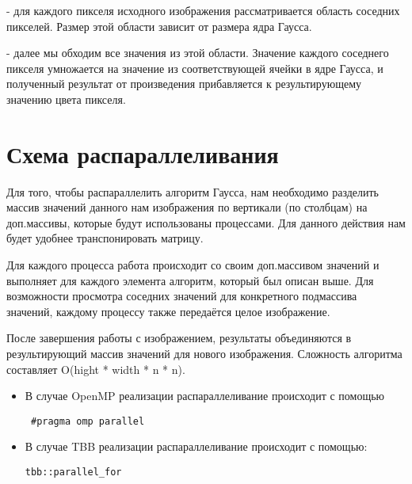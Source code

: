 \documentclass{report}
\begin{document}
    -    для каждого пикселя исходного изображения рассматривается область соседних пикселей. Размер этой области зависит от размера ядра Гаусса.

    -    далее мы обходим все значения из этой области. Значение каждого соседнего пикселя умножается на значение из соответствующей ячейки в ядре Гаусса, и полученный результат от произведения прибавляется к результирующему значению цвета пикселя.
\newpage

\section*{Схема распараллеливания}
Для того, чтобы распараллелить алгоритм Гаусса, нам необходимо разделить массив значений данного нам изображения по вертикали (по столбцам) на доп.массивы, которые будут использованы процессами. Для данного действия нам будет удобнее транспонировать матрицу. 
\par
Для каждого процесса работа происходит со своим доп.массивом значений и выполняет для каждого элемента алгоритм, который был описан выше. Для возможности просмотра соседних значений для конкретного подмассива значений, каждому процессу также передаётся целое изображение.
\par
После завершения работы с изображением, результаты объединяются в результирующий массив значений для нового изображения. Сложность алгоритма составляет O(hight * width * n * n).
\begin{itemize}
\item В случае OpenMP реализации распараллеливание происходит с помощью 
 \begin{lstlisting}
 #pragma omp parallel
\end{lstlisting}
\item В случае TBB реализации распараллеливание происходит с помощью:
\begin{lstlisting}
tbb::parallel_for
\end{lstlisting}

\end{itemize}
\newpage

\end{document}
